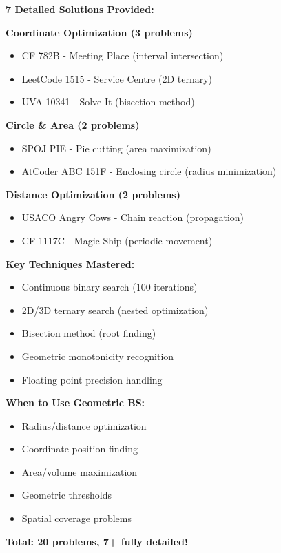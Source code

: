 \documentclass[11pt,a4paper,oneside]{book}
\begin{document}
\begin{tcolorbox}[
    enhanced,breakable,
    colback=primaryblue!10,
    colframe=primaryblue,
    boxrule=2pt,
    arc=4mm,
    title=\textbf{Geometric Binary Search: Complete Mastery}
]
\textbf{7 Detailed Solutions Provided:}

\textbf{Coordinate Optimization (3 problems)}
\begin{itemize}
\item CF 782B - Meeting Place (interval intersection)
\item LeetCode 1515 - Service Centre (2D ternary)
\item UVA 10341 - Solve It (bisection method)
\end{itemize}

\textbf{Circle \& Area (2 problems)}
\begin{itemize}
\item SPOJ PIE - Pie cutting (area maximization)
\item AtCoder ABC 151F - Enclosing circle (radius minimization)
\end{itemize}

\textbf{Distance Optimization (2 problems)}
\begin{itemize}
\item USACO Angry Cows - Chain reaction (propagation)
\item CF 1117C - Magic Ship (periodic movement)
\end{itemize}

\textbf{Key Techniques Mastered:}
\begin{itemize}
\item Continuous binary search (100 iterations)
\item 2D/3D ternary search (nested optimization)
\item Bisection method (root finding)
\item Geometric monotonicity recognition
\item Floating point precision handling
\end{itemize}

\textbf{When to Use Geometric BS:}
\begin{itemize}
\item [$\checkmark$] Radius/distance optimization
\item [$\checkmark$] Coordinate position finding
\item [$\checkmark$] Area/volume maximization
\item [$\checkmark$] Geometric thresholds
\item [$\checkmark$] Spatial coverage problems
\end{itemize}

\textbf{Total: 20 problems, 7+ fully detailed!}
\end{tcolorbox}
\end{document}
